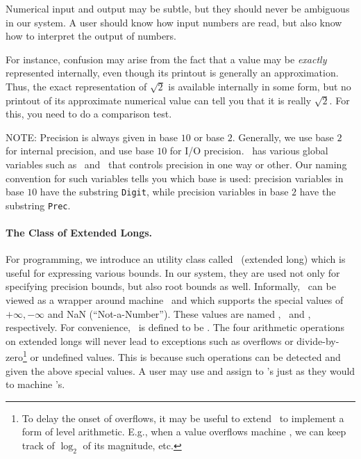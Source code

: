 \documentclass[12pt]{article}
\begin{document}
Numerical input and output may be subtle,
but they should never be ambiguous in our system.
A user should know how input numbers are read,
but also know how to interpret the output of numbers.

For instance, confusion may arise from the fact that
a value may be {\em exactly} represented internally,
even though its printout is generally an approximation.
Thus, the exact representation of $\sqrt{2}$
is available internally in some form,
but no printout of its approximate numerical value can tell you
that it is really $\sqrt{2}$.  For this, you need to
do a comparison test.

NOTE: Precision is always given in base $10$ or base $2$.  
Generally, we use base $2$ for internal precision, and use base $10$ for
I/O precision.  \core\ has various global variables
such as \ and \ that controls precision in one
way or other.   Our naming convention for such variables tells you
which base is used:
precision variables in base $10$ have the substring \texttt{Digit},
while precision variables in base $2$ have the substring \texttt{Prec}.

\paragraph{The Class of Extended Longs.}
For programming, we introduce
an utility class called \extlong\ (extended long)
which is useful for expressing various bounds.
In our system, they are used not only for specifying
precision bounds, but also root bounds as well.
Informally, \extlong\ can be viewed as a wrapper
around machine \lng\ and which supports the
special values of $+\infty, -\infty$ and NaN (``Not-a-Number'').
These values are named \posInfty, \negInfty\ and \NaN, respectively.
For convenience, \coreInfty\ is defined to be \posInfty.
The four arithmetic operations on extended
longs will never lead to exceptions such as overflows or divide-by-zero\footnote{
%
To delay the onset of overflows, it may be useful to extend
\extlong\ to implement a form of level arithmetic.
E.g., when a value overflows machine \lng, we can keep track
of $\log_2$ of its magnitude, etc.
%
} or undefined values.  This is because such operations can
be detected and given the above special values.
A user may use and assign to \extlong's just as they would to machine \lng's.
\end{document}
